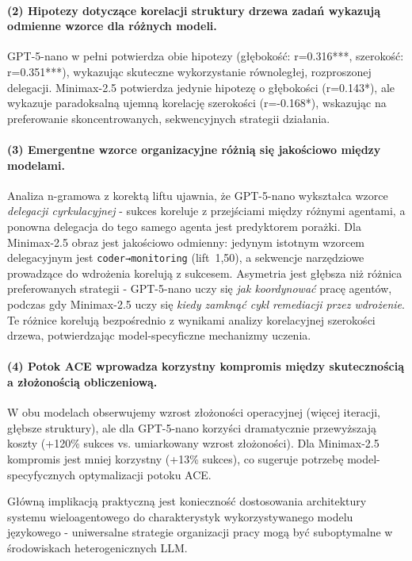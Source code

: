 \paragraph{(2) Hipotezy dotyczące korelacji struktury drzewa zadań wykazują odmienne wzorce dla różnych modeli.}
GPT-5-nano w pełni potwierdza obie hipotezy (głębokość: r=0.316***, szerokość: r=0.351***), wykazując skuteczne wykorzystanie równoległej, rozproszonej delegacji. Minimax-2.5 potwierdza jedynie hipotezę o głębokości (r=0.143*), ale wykazuje paradoksalną ujemną korelację szerokości (r=-0.168*), wskazując na preferowanie skoncentrowanych, sekwencyjnych strategii działania.

\paragraph{(3) Emergentne wzorce organizacyjne różnią się jakościowo między modelami.}
Analiza n-gramowa z korektą liftu ujawnia, że GPT-5-nano wykształca wzorce \emph{delegacji cyrkulacyjnej} - sukces koreluje z przejściami między różnymi agentami, a ponowna delegacja do tego samego agenta jest predyktorem porażki. Dla Minimax-2.5 obraz jest jakościowo odmienny: jedynym istotnym wzorcem delegacyjnym jest \texttt{coder→monitoring} (lift~1,50), a sekwencje narzędziowe prowadzące do wdrożenia korelują z sukcesem. Asymetria jest głębsza niż różnica preferowanych strategii - GPT-5-nano uczy się \emph{jak koordynować} pracę agentów, podczas gdy Minimax-2.5 uczy się \emph{kiedy zamknąć cykl remediacji przez wdrożenie}. Te różnice korelują bezpośrednio z wynikami analizy korelacyjnej szerokości drzewa, potwierdzając model-specyficzne mechanizmy uczenia.

\paragraph{(4) Potok ACE wprowadza korzystny kompromis między skutecznością a złożonością obliczeniową.}
W obu modelach obserwujemy wzrost złożoności operacyjnej (więcej iteracji, głębsze struktury), ale dla GPT-5-nano korzyści dramatycznie przewyższają koszty (+120\% sukces vs. umiarkowany wzrost złożoności). Dla Minimax-2.5 kompromis jest mniej korzystny (+13\% sukces), co sugeruje potrzebę model-specyfycznych optymalizacji potoku ACE.

Główną implikacją praktyczną jest konieczność dostosowania architektury systemu wieloagentowego do charakterystyk wykorzystywanego modelu językowego - uniwersalne strategie organizacji pracy mogą być suboptymalne w środowiskach heterogenicznych LLM.
